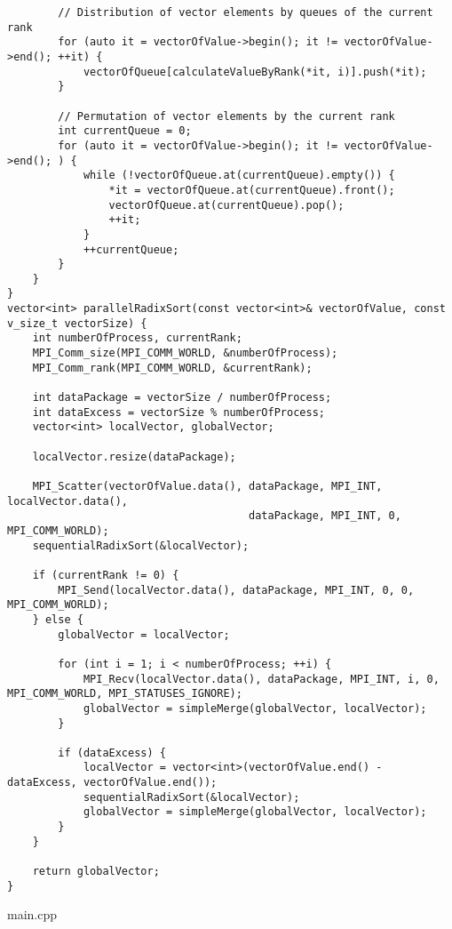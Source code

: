 \documentclass{report}
\begin{document}
\begin{lstlisting}
        // Distribution of vector elements by queues of the current rank
        for (auto it = vectorOfValue->begin(); it != vectorOfValue->end(); ++it) {
            vectorOfQueue[calculateValueByRank(*it, i)].push(*it);
        }

        // Permutation of vector elements by the current rank
        int currentQueue = 0;
        for (auto it = vectorOfValue->begin(); it != vectorOfValue->end(); ) {
            while (!vectorOfQueue.at(currentQueue).empty()) {
                *it = vectorOfQueue.at(currentQueue).front();
                vectorOfQueue.at(currentQueue).pop();
                ++it;
            }
            ++currentQueue;
        }
    }
}
vector<int> parallelRadixSort(const vector<int>& vectorOfValue, const v_size_t vectorSize) {
    int numberOfProcess, currentRank;
    MPI_Comm_size(MPI_COMM_WORLD, &numberOfProcess);
    MPI_Comm_rank(MPI_COMM_WORLD, &currentRank);

    int dataPackage = vectorSize / numberOfProcess;
    int dataExcess = vectorSize % numberOfProcess;
    vector<int> localVector, globalVector;

    localVector.resize(dataPackage);

    MPI_Scatter(vectorOfValue.data(), dataPackage, MPI_INT, localVector.data(),
                                      dataPackage, MPI_INT, 0, MPI_COMM_WORLD);
    sequentialRadixSort(&localVector);

    if (currentRank != 0) {
        MPI_Send(localVector.data(), dataPackage, MPI_INT, 0, 0, MPI_COMM_WORLD);
    } else {
        globalVector = localVector;

        for (int i = 1; i < numberOfProcess; ++i) {
            MPI_Recv(localVector.data(), dataPackage, MPI_INT, i, 0, MPI_COMM_WORLD, MPI_STATUSES_IGNORE);
            globalVector = simpleMerge(globalVector, localVector);
        }

        if (dataExcess) {
            localVector = vector<int>(vectorOfValue.end() - dataExcess, vectorOfValue.end());
            sequentialRadixSort(&localVector);
            globalVector = simpleMerge(globalVector, localVector);
        }
    }

    return globalVector;
}

\end{lstlisting}
\begin{center}
    main.cpp
\end{center}
\end{document}
